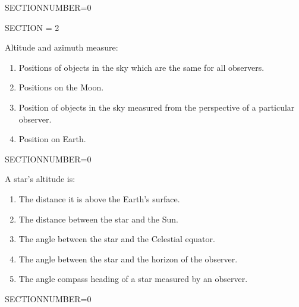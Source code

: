 \documentclass[11pt]{article}
\begin{document}
\begin{enumerate}
\begin{minipage}{\textwidth}
\begin{minipage}{\textwidth}
\end{minipage}
SECTIONNUMBER=0
\end{minipage}
\vskip 0.20in

\pagebreak 
\begin{minipage}{\textwidth} 
\begin{minipage}{\textwidth} 
\bigskip SECTION = 2
\end{minipage}
\end{minipage}
\begin{minipage}{\textwidth}
\begin{minipage}{\textwidth}
\item Altitude and azimuth measure:
\begin{enumerate} 
\setlength{\itemsep}{1pt} 
\setlength{\parskip}{0pt} 
\setlength{\parsep}{0pt}
\setlength{\multicolsep}{1pt} 
\item Positions of objects in the sky which are the same for all observers.
\item Positions on the Moon.
\item Position of objects in the sky measured from the perspective of a particular observer.
\item Position on Earth.
\end{enumerate} 
\end{minipage}
SECTIONNUMBER=0
\end{minipage}
\vskip 0.20in

\begin{minipage}{\textwidth}
\begin{minipage}{\textwidth}
\item A star's altitude is:
\begin{enumerate} 
\setlength{\itemsep}{1pt} 
\setlength{\parskip}{0pt} 
\setlength{\parsep}{0pt}
\setlength{\multicolsep}{1pt} 
\item The distance it is above the Earth's surface.
\item The distance between the star and the Sun.
\item The angle between the star and the Celestial equator.
\item The angle between the star and the horizon of the observer.
\item The angle compass heading of a star measured by an observer.
\end{enumerate} 
\end{minipage}
SECTIONNUMBER=0
\end{minipage}
\vskip 0.20in


\end{enumerate}
\end{document}
